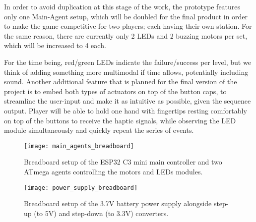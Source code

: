 \documentclass[a4paper]{article}
\begin{document}
\noindent In order to avoid duplication at this stage of the work, the prototype features only one Main-Agent setup, which will be doubled for the final product in order to make the game competitive for two players; each having their own station.
For the same reason, there are currently only 2 LEDs and 2 buzzing motors per set, which will be increased to 4 each.

\noindent For the time being, red/green LEDs indicate the failure/success per level, but we think of adding something more multimodal if time allows, potentially including sound.
\noindent Another additional feature that is planned for the final version of the project is to embed both types of actuators on top of the button caps, to streamline the user-input and make it as intuitive as possible, given the sequence output. Player will be able to hold one hand with fingertips resting comfortably on top of the buttons to receive the haptic signals, while observing the LED module simultaneously and quickly repeat the series of events.


\begin{figure*}[!htb]
  \centering
  \texttt{[image: main\_agents\_breadboard]}
  \caption[Breadboard with main and two agents.]{Breadboard setup of the ESP32 C3 mini main controller and two ATmega agents controlling the motors and LEDs modules.}
  \label{fig:main_agents_breadboard}
\end{figure*}

\begin{figure*}[!htb]
  \centering
  \texttt{[image: power\_supply\_breadboard]}
  \caption[Breadboard with the power supply setup.]{Breadboard setup of the 3.7V battery power supply alongside step-up (to 5V) and step-down (to 3.3V) converters.}
  \label{fig:power_supply_breadboard}
\end{figure*}
\end{document}
